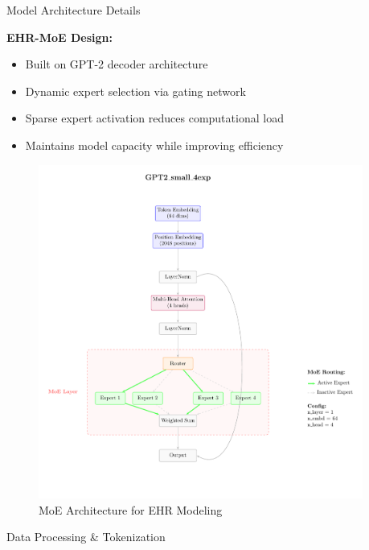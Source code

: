 \documentclass[final]{beamer}
\newlength{\sepwidth}
\newlength{\colwidth}
\newcommand{\separatorcolumn}{\begin{column}{\sepwidth}\end{column}}
\begin{document}
\begin{frame}[t]
\begin{columns}[t]



\separatorcolumn

\begin{column}{\colwidth}

  \begin{block}{Model Architecture Details}
    
    \textbf{EHR-MoE Design:}
    \begin{itemize}
        \item Built on GPT-2 decoder architecture
        \item Dynamic expert selection via gating network
        \item Sparse expert activation reduces computational load
        \item Maintains model capacity while improving efficiency
    \end{itemize}

        \begin{figure}
            \centering
            \includegraphics[width=0.6\linewidth]{figures/moe_architecture_tikz.pdf}
            \caption{MoE Architecture for EHR Modeling}
            \label{fig:moe_architecture}
        \end{figure}


       
  \end{block}

  \begin{block}{Data Processing \& Tokenization}
    

\end{block}
\end{column}
\end{columns}
\end{frame}
\end{document}
